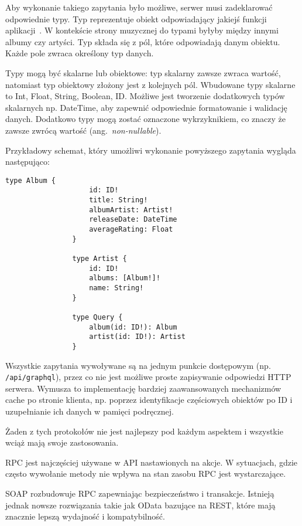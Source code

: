 \begin{description}
			Aby wykonanie takiego zapytania było możliwe, serwer musi zadeklarować odpowiednie typy.
			Typ reprezentuje obiekt odpowiadający jakiejś funkcji aplikacji~\cite{GraphQL}.
			W kontekście strony muzycznej do typami byłyby między innymi albumy czy artyści.
			Typ składa się z pól, które odpowiadają danym obiektu.
			Każde pole zwraca określony typ danych.

			Typy mogą być skalarne lub obiektowe: typ skalarny zawsze zwraca wartość, natomiast typ obiektowy złożony jest z kolejnych pól.
			Wbudowane typy skalarne to Int, Float, String, Boolean, ID.
			Możliwe jest tworzenie dodatkowych typów skalarnych np. DateTime, aby zapewnić odpowiednie formatowanie i walidację danych.
			Dodatkowo typy mogą zostać oznaczone wykrzyknikiem, co znaczy że zawsze zwrócą wartość (ang.\ \emph{non-nullable}).
			
			Przykładowy schemat, który umożliwi wykonanie powyższego zapytania wygląda następująco:
			
			\begin{lstlisting}[label=lst:gqlSchema]
				type Album {
					id: ID!
					title: String!
					albumArtist: Artist!
					releaseDate: DateTime
					averageRating: Float
				}

				type Artist {
					id: ID!
					albums: [Album!]!
					name: String!
				}

				type Query {
					album(id: ID!): Album
					artist(id: ID!): Artist
				}
			\end{lstlisting}

			Wszystkie zapytania wywoływane są na jednym punkcie dostępowym (np. \verb|/api/graphql|),
			przez co nie jest możliwe proste zapisywanie odpowiedzi HTTP serwera.
			Wymusza to implementację bardziej zaawansowanych mechanizmów cache po stronie klienta,
			np. poprzez identyfikacje częściowych obiektów po ID i uzupełnianie ich danych w pamięci podręcznej.
	\end{description}

	Żaden z tych protokołów nie jest najlepszy pod każdym aspektem i wszystkie wciąż mają swoje zastosowania.
	
	RPC jest najczęściej używane w API nastawionych na akcje.
	W sytuacjach, gdzie często wywołanie metody nie wpływa na stan zasobu RPC jest wystarczające.

	SOAP rozbudowuje RPC zapewniając bezpieczeństwo i transakcje.
	Istnieją jednak nowsze rozwiązania takie jak OData bazujące na REST, które mają znacznie lepszą wydajność i kompatybilność.

